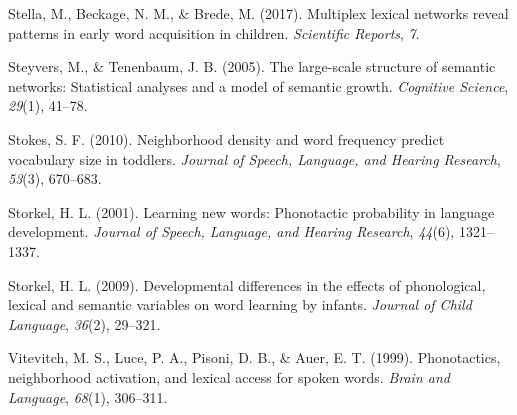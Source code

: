 \documentclass[10pt, letterpaper]{article}
\begin{document}
\hypertarget{ref-stella2017}{}
Stella, M., Beckage, N. M., \& Brede, M. (2017). Multiplex lexical
networks reveal patterns in early word acquisition in children.
\emph{Scientific Reports}, \emph{7}.

\hypertarget{ref-steyvers2005}{}
Steyvers, M., \& Tenenbaum, J. B. (2005). The large-scale structure of
semantic networks: Statistical analyses and a model of semantic growth.
\emph{Cognitive Science}, \emph{29}(1), 41--78.

\hypertarget{ref-stokes2010}{}
Stokes, S. F. (2010). Neighborhood density and word frequency predict
vocabulary size in toddlers. \emph{Journal of Speech, Language, and
Hearing Research}, \emph{53}(3), 670--683.

\hypertarget{ref-storkel2001}{}
Storkel, H. L. (2001). Learning new words: Phonotactic probability in
language development. \emph{Journal of Speech, Language, and Hearing
Research}, \emph{44}(6), 1321--1337.

\hypertarget{ref-storkel2009}{}
Storkel, H. L. (2009). Developmental differences in the effects of
phonological, lexical and semantic variables on word learning by
infants. \emph{Journal of Child Language}, \emph{36}(2), 29--321.

\hypertarget{ref-vitevitch1999}{}
Vitevitch, M. S., Luce, P. A., Pisoni, D. B., \& Auer, E. T. (1999).
Phonotactics, neighborhood activation, and lexical access for spoken
words. \emph{Brain and Language}, \emph{68}(1), 306--311.
\end{document}
